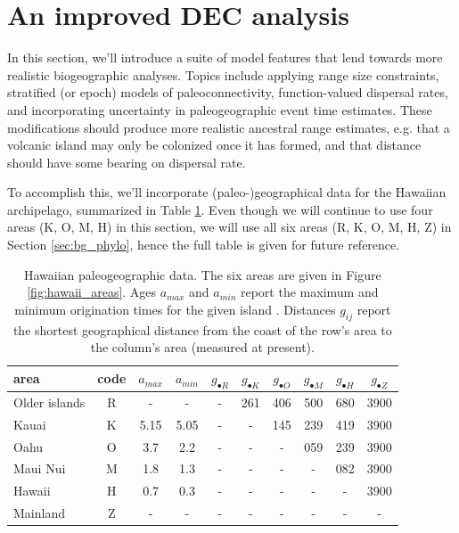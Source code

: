 

\section{An improved DEC analysis} \label{sec:bg_epoch}

In this section, we'll introduce a suite of model features that lend towards more realistic biogeographic analyses.
Topics include applying range size constraints, stratified (or epoch) models of paleoconnectivity, function-valued dispersal rates, and incorporating uncertainty in paleogeographic event time estimates.
These modifications should produce more realistic ancestral range estimates, e.g. that a volcanic island may only be colonized once it has formed, and that distance should have some bearing on dispersal rate.

To accomplish this, we'll incorporate (paleo-)geographical data for the Hawaiian archipelago, summarized in Table \ref{tab:paleogeo}.
Even though we will continue to use four areas (K, O, M, H) in this section, we will use all six areas (R, K, O, M, H, Z) in Section \ref{sec:bg_phylo}, hence the full table is given for future reference.

\begin{table}[!h]
\centering
\begin{tabular}{l|c|cc|cccccc}
area & code & $a_{max}$ & $a_{min}$ & $g_{\bullet R}$ & $g_{\bullet K}$ & $g_{\bullet O}$ & $g_{\bullet M}$ & $g_{\bullet H}$  & $g_{\bullet Z}$ \\ \hline
Older islands & R & -    & -    & - & 261 & 406 & 500 & 680 & 3900 \\
Kauai         & K & 5.15 & 5.05 & - & -   & 145 & 239 & 419 & 3900 \\
Oahu          & O & 3.7  & 2.2  & - & -   & -   & 059 & 239 & 3900 \\
Maui Nui      & M & 1.8  & 1.3  & - & -   & -   & -   & 082 & 3900 \\
Hawaii        & H & 0.7  & 0.3  & - & -   & -   & -   & -   & 3900 \\
Mainland      & Z & -    & -    & - & -   & -   & -   & -   & - \\
\end{tabular}
\caption{Hawaiian paleogeographic data.
The six areas are given in Figure \ref{fig:hawaii_areas}.
Ages $a_{max}$ and $a_{min}$ report the maximum and minimum origination times for the given island \citep[adapted from][]{Neall2008}.
Distances $g_{ij}$ report the shortest geographical distance from the coast of the row's area to the column's area (measured at present).}
\label{tab:paleogeo}
\end{table}

